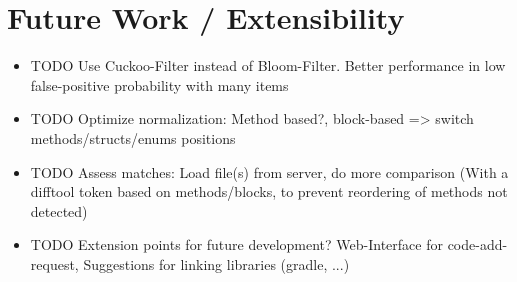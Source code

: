 \section{Future Work / Extensibility}\label{section:approach/extensibility}
\begin{itemize}
	\item TODO Use Cuckoo-Filter \cite{fan2014cuckoo} instead of Bloom-Filter. Better performance in low false-positive probability with many items
	\item TODO Optimize normalization: Method based?, block-based => switch methods/structs/enums positions
	\item TODO Assess matches: Load file(s) from server, do more comparison (With a difftool token based on methods/blocks, to prevent reordering of methods not detected)
	\item TODO Extension points for future development? Web-Interface for code-add-request, Suggestions for linking libraries (gradle, ...)
\end{itemize}